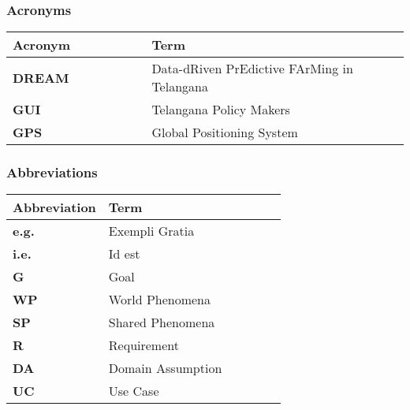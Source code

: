 \subsubsection{Acronyms}
\begin{center}
    \begin{tabular}{p{0.35\linewidth} p{0.65\linewidth}}
    \hline
        \textbf{Acronym} & \textbf{Term}\\
        \hline
        \textbf{DREAM} & Data-dRiven PrEdictive FArMing in Telangana\\
        \textbf{GUI} & Telangana Policy Makers\\
        \textbf{GPS} & Global Positioning System\\
    \hline
    \end{tabular}
\end{center}

\subsubsection{Abbreviations}
\begin{center}
    \begin{tabular}{p{0.35\linewidth} p{0.65\linewidth}}
    \hline
        \textbf{Abbreviation} & \textbf{Term}\\
    \hline
        \textbf{e.g.} & Exempli Gratia\\
        \textbf{i.e.} & Id est\\
        \textbf{G} & Goal\\
        \textbf{WP} & World Phenomena\\
        \textbf{SP} & Shared Phenomena\\
        \textbf{R} & Requirement\\
        \textbf{DA} & Domain Assumption\\
        \textbf{UC} & Use Case\\
    \hline
    \end{tabular}
\end{center}
\newpage

